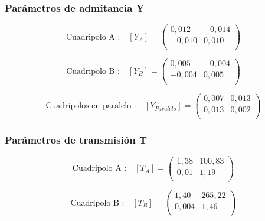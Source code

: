 \documentclass[a4paper]{article}
\begin{document}
\subsubsection*{Parámetros de admitancia Y}

\begin{equation}
\text{Cuadripolo A :}\quad [Y_{A}] =
\left( \begin{array}{cc}
	0,012 & -0,014\\
	-0,010 & 0,010\\
\end{array} \right)
\end{equation}

\begin{equation}
\text{Cuadripolo B :}\quad [Y_{B}] =
\left( \begin{array}{cc}
	0,005 & -0,004\\
	-0,004 & 0,005\\
\end{array} \right)
\end{equation}

\begin{equation}
\text{Cuadripolos en paralelo :}\quad [Y_{Paralelo}] =
\left( \begin{array}{cc}
	0,007 & 0,013\\
	0,013 & 0,002\\
\end{array} \right)
\end{equation}

\subsubsection*{Parámetros de transmisión T}

\begin{equation}
\text{Cuadripolo A :}\quad [T_{A}] =
\left( \begin{array}{cc}
	1,38 & 100,83\\
	0,01 & 1,19\\
\end{array} \right)
\end{equation}

\begin{equation}
\text{Cuadripolo B :}\quad [T_{B}] =
\left( \begin{array}{cc}
	1,40 & 265,22\\
	0,004 & 1,46\\
\end{array} \right)
\end{equation}
\end{document}
